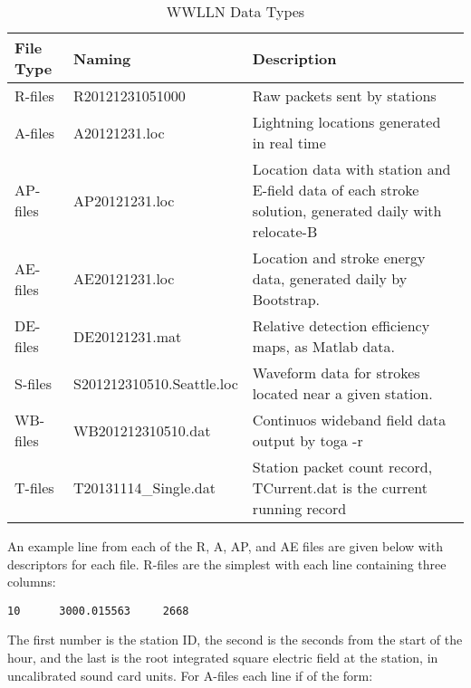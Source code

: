 \begin{table}[h!]
\begin{center}
\caption{WWLLN Data Types}
\begin{tabular}{|p{.75in}|p{2in}|p{3.5in}|}

\hline
{\bf File Type} & {\bf Naming} &	{\bf Description} \\

\hline
\rule{0pt}{3ex}
R-files	& R20121231051000	&	Raw packets sent by stations\\ 

\hline
\rule{0pt}{3ex}
A-files	& A20121231.loc	&	Lightning locations generated in real time\\ 

\hline
\rule{0pt}{3ex}
AP-files	& AP20121231.loc	&	Location data with station and E-field data of each stroke solution, generated daily with relocate-B\\ 

\hline
\rule{0pt}{3ex}
AE-files	& AE20121231.loc	&	Location and stroke energy data, generated daily by Bootstrap.\\ 

\hline
\rule{0pt}{3ex}
DE-files	& DE20121231.mat	&	Relative detection efficiency maps, as Matlab data.\\ 

\hline
\rule{0pt}{3ex}
S-files	& S201212310510.Seattle.loc	&	Waveform data for strokes located near a given station.\\ 

\hline
\rule{0pt}{3ex}
WB-files	& WB201212310510.dat	&	Continuos wideband field data output by toga -r\\ 

\hline
\rule{0pt}{3ex}
T-files	& T20131114\_Single.dat	&	Station packet count record, TCurrent.dat is the current running record\\ 

\hline
\end{tabular}
\end{center}
\label{code:table:fileType}
\end{table}
 
An example line from each of the R, A, AP, and AE files are given below with descriptors for each file.
R-files are the simplest with each line containing three columns:

\begin{verbatim}
10      3000.015563     2668
\end{verbatim}

The first number is the station ID, the second is the seconds from the start of the hour, and the last is the root integrated square electric field at the station, in uncalibrated sound card units.
For A-files each line if of the form:

